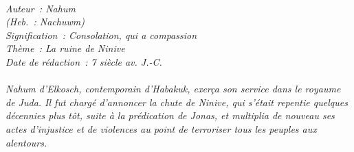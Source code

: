 \BFont
\noindent\hrulefill
{\footnotesize
\textit{
\bigskip
{\centering{}
\\Auteur~: Nahum
\\(Heb.~: Nachuwm)
\\Signification~: Consolation, qui a compassion
\\Thème~: La ruine de Ninive
\\Date de rédaction~: 7 siècle av. J.-C.\\}
}
\textit{
\\Nahum d'Elkosch, contemporain d'Habakuk, exerça son service dans le royaume de Juda. Il fut chargé d'annoncer la chute de Ninive, qui s'était repentie quelques décennies plus tôt, suite à la prédication de Jonas, et multiplia de nouveau ses actes d'injustice et de violences au point de terroriser tous les peuples aux alentours.\bigskip
}
}
\par\nobreak\noindent\hrulefill

